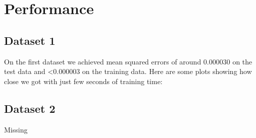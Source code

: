 \documentclass{article}
\begin{document}
\section{Performance}
\subsection{Dataset 1}
On the first dataset we achieved mean squared errors of around 0.000030 on the test data and <0.000003 on the training data. Here are some plots showing how close we got with just few seconds of training time:
\begin{figure}[h]
\centering
{}
\end{figure}
\subsection{Dataset 2}
Missing
\end{document}
